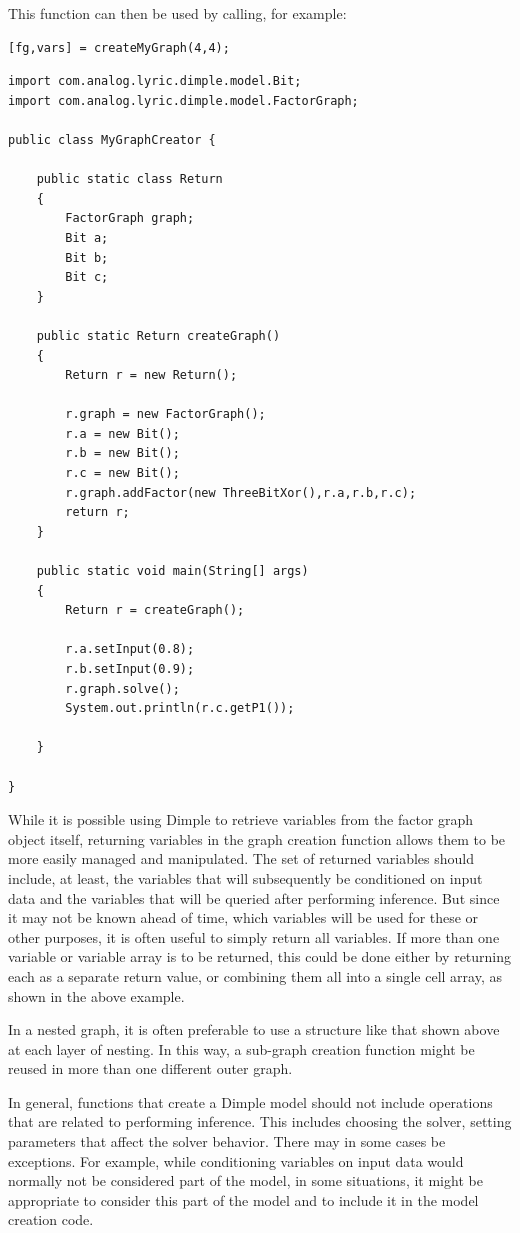 This function can then be used by calling, for example:

\begin{lstlisting}
[fg,vars] = createMyGraph(4,4);
\end{lstlisting}

\fi

\ifjava
\begin{lstlisting}
import com.analog.lyric.dimple.model.Bit;
import com.analog.lyric.dimple.model.FactorGraph;

public class MyGraphCreator {

	public static class Return
	{
		FactorGraph graph;
		Bit a;
		Bit b;
		Bit c;
	}
	
	public static Return createGraph()
	{
		Return r = new Return();
		
		r.graph = new FactorGraph();
		r.a = new Bit();
		r.b = new Bit();
		r.c = new Bit();
		r.graph.addFactor(new ThreeBitXor(),r.a,r.b,r.c);
		return r;
	}
	
	public static void main(String[] args) 
	{
		Return r = createGraph();
		
		r.a.setInput(0.8);
		r.b.setInput(0.9);
		r.graph.solve();
		System.out.println(r.c.getP1());

	}

}
\end{lstlisting}
\fi

While it is possible using Dimple to retrieve variables from the factor graph object itself, returning variables in the graph creation function allows them to be more easily managed and manipulated.  The set of returned variables should include, at least, the variables that will subsequently be conditioned on input data and the variables that will be queried after performing inference.  But since it may not be known ahead of time, which variables will be used for these or other purposes, it is often useful to simply return all variables.  If more than one variable or variable array is to be returned, this could be done either by returning each as a separate return value, or combining them all into a single cell array, as shown in the above example.

In a nested graph, it is often preferable to use a structure like that shown above at each layer of nesting.  In this way, a sub-graph creation function might be reused in more than one different outer graph.

In general, functions that create a Dimple model should not include operations that are related to performing inference.  This includes choosing the solver, setting parameters that affect the solver behavior.  There may in some cases be exceptions.  For example, while conditioning variables on input data would normally not be considered part of the model, in some situations, it might be appropriate to consider this part of the model and to include it in the model creation code.




